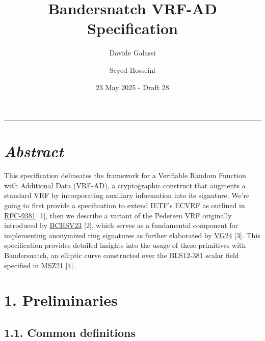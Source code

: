 \documentclass[
]{article}
\title{Bandersnatch VRF-AD Specification}
\author{Davide Galassi \and Seyed Hosseini}
\date{23 May 2025 - Draft 28}
\begin{document}
\maketitle

\newcommand{\G}{\bold{G}}
\newcommand{\F}{\bold{F}}
\newcommand{\S}{\bold{\Sigma}}

\begin{center}\rule{0.5\linewidth}{0.5pt}\end{center}

\section{\texorpdfstring{\emph{Abstract}}{Abstract}}\label{abstract}

This specification delineates the framework for a Verifiable Random
Function with Additional Data (VRF-AD), a cryptographic construct that
augments a standard VRF by incorporating auxiliary information into its
signature. We're going to first provide a specification to extend IETF's
ECVRF as outlined in
\href{https://datatracker.ietf.org/doc/rfc9381}{RFC-9381} {[}1{]}, then
we describe a variant of the Pedersen VRF originally introduced by
\href{https://eprint.iacr.org/2023/002}{BCHSV23} {[}2{]}, which serves
as a fundamental component for implementing anonymized ring signatures
as further elaborated by
\href{https://github.com/davxy/ring-proof-spec}{VG24} {[}3{]}. This
specification provides detailed insights into the usage of these
primitives with Bandersnatch, an elliptic curve constructed over the
BLS12-381 scalar field specified in
\href{https://eprint.iacr.org/2021/1152}{MSZ21} {[}4{]}.

\section{1. Preliminaries}\label{preliminaries}

\subsection{1.1. Common definitions}\label{common-definitions}
\end{document}
